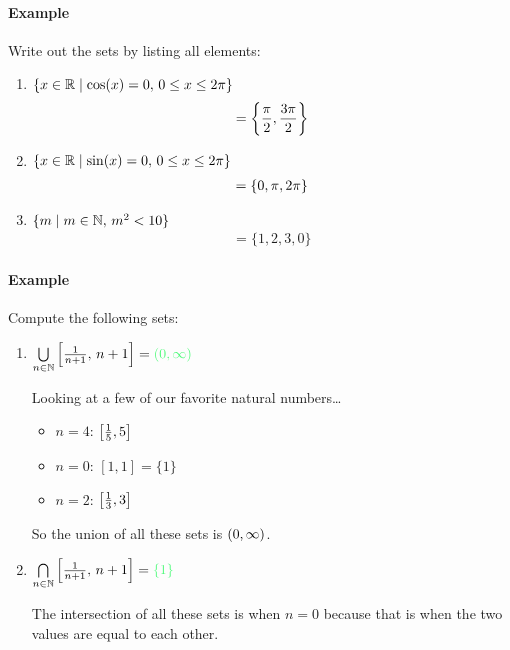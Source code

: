 \documentclass[../main.tex]{subfiles}
\begin{document}
\newpage
{}

\paragraph{Example} Write out the sets by listing all elements:

\begin{enumerate}
    \item 
    \(
        \{x \in \mathbb{R} \mid \cos(x) = 0, \, 0 \leq x \leq 2\pi\}
    \)
    \begin{align*}
        = \qt{
            \frac{\pi}{2}, \frac{3\pi}{2}
        }
    \end{align*}
    \item 
    \(
        \{x \in \mathbb{R} \mid \sin(x) = 0, \, 0 \leq x \leq 2\pi\}
    \)
    \begin{align*}
        = \qt{
            0, \pi, 2\pi
        }
    \end{align*}

    \item
    \(
        \{
            m \mid m \in \mathbb{N},\, m^2 < 10
        \}
    \)
    \begin{align*}
        = \{1, 2, 3, 0\}
    \end{align*}
\end{enumerate}

\paragraph{Example} Compute the following sets:

\begin{enumerate}
    \item 
    \(
        \bigcup\limits_{n \in \N} \qt[
            \frac{1}{n +1} ,\, n + 1 
        ]
        = \color{draculagreen} (0, \infty)
    \)

    Looking at a few of our favorite natural numbers\dots
    \begin{itemize}
        \item $n = 4$: $\qt[\frac{1}{5}, 5]$
        \item $n = 0$: $[1, 1] = \{1\}$
        \item $n = 2$: $\qt[\frac{1}{3}, 3]$
    \end{itemize}
    So the union of all these sets is $\qt(0, \infty)$.

    \item \( \bigcap\limits_{n \in \N} \qt[\frac{1}{n + 1} ,\, n + 1] 
    = \color{draculagreen} \{1\} \)

    The intersection of all these sets is when $n = 0$ because that is when the two values are equal
    to each other.
\end{enumerate}
\end{document}
